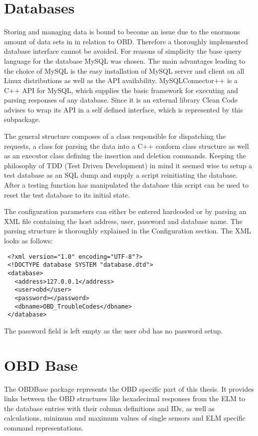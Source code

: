 
\section{Databases}
\label{sec:database}
Storing and managing data is bound to become an issue due to the enormous amount of data sets in in relation to OBD. Therefore a thoroughly 
implemented database interface cannot be avoided. For reasons of simplicity the base query language for the database MySQL was chosen. The main 
advantages leading to the choice of MySQL is the easy installation of MySQL server and client on all Linux distributions as well as the API 
availability. MySQLConnector++ is a C++ API for MySQL, which supplies the basic framework for executing and parsing responses of any database. 
Since it is an external library  Clean Code advises to wrap its API in a self defined interface, which is represented by this subpackage. 

The general structure composes of a class responsible for dispatching the requests, a class for parsing the data into a C++ conform class 
structure as well as an executor class defining the insertion and deletion commands. Keeping the philosophy of TDD (Test Driven Development) 
in mind it seemed wise to setup a test database as an SQL dump and supply a script reinitiating the database. After a testing function has 
manipulated the database this script can be used to reset the test database to its initial state. 

The configuration parameters can either be entered hardcoded or by parsing an XML file containing the host address, user, password and database 
name. The parsing  structure is thoroughly explained in the Configuration section. The XML looks as follows:

\begin{verbatim}
 <?xml version="1.0" encoding="UTF-8"?>
 <!DOCTYPE database SYSTEM "database.dtd">
 <database>
   <address>127.0.0.1</address>
   <user>obd</user>
   <password></password>
   <dbname>OBD_TroubleCodes</dbname>
 </database>
\end{verbatim}

The password field is left empty as the user obd has no password setup.  


\section{OBD Base}
\label{sec:obdbase}
The OBDBase package represents the OBD specific part of this thesis. It provides links between the OBD structures like hexadecimal responses 
from the ELM to the database entries with their column definitions and IDs, as well as calculations, minimum and maximum values of single 
sensors and ELM specific command representations.

